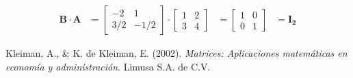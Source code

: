 \documentclass[a4paper,12pt]{report} %
\begin{document}
\[
\begin{aligned}
\mathbf{B\cdot A} &= \begin{bmatrix}
    -2 & 1 \\
    3/2 & -1/2
\end{bmatrix}
\cdot
\begin{bmatrix}
    1 & 2 \\
    3 & 4
\end{bmatrix}
&= \begin{bmatrix}
    1 & 0 \\
    0 & 1
\end{bmatrix}
&= \mathbf{I_{2}}
\end{aligned}
\]

\begin{thebibliography}{2}

Kleiman, A., \& K. de Kleiman, E. (2002). \emph{Matrices: Aplicaciones matemáticas en economía y administración}. Limusa S.A. de C.V.

    
\end{thebibliography}    
    
\end{document}
